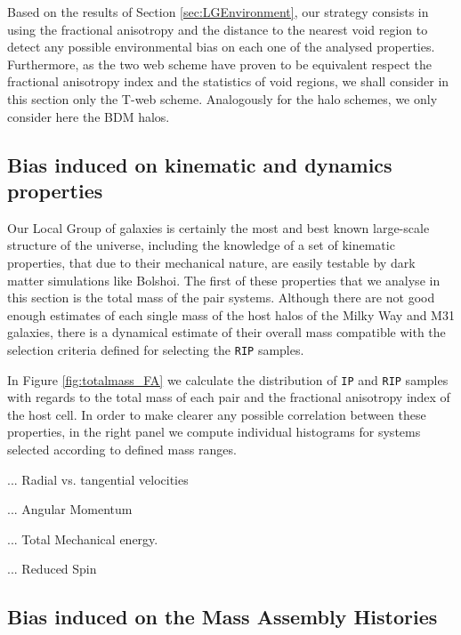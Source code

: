 \documentclass[usenatbib]{latex/mn2e}
\begin{document}
Based on the results of Section \ref{sec:LGEnvironment}, our strategy 
consists in using the fractional anisotropy and the distance to the 
nearest void region to detect any possible environmental bias on each
one of the analysed properties. Furthermore, as the two web scheme have
proven to be equivalent respect the fractional anisotropy index and the
statistics of void regions, we shall consider in this section only the 
T-web scheme. Analogously for the halo schemes, we only consider here the
BDM halos.




\subsection{Bias induced on kinematic and dynamics properties}
\label{subsec:bias_kinematic}



Our Local Group of galaxies is certainly the most and best known 
large-scale structure of the universe, including the knowledge of a set of
kinematic properties, that due to their mechanical nature, are easily 
testable by dark matter simulations like Bolshoi. The first of these 
properties that we analyse in this section is the total mass of the pair 
systems. Although there are not good enough estimates of each single mass 
of the host halos of the Milky Way and M31 galaxies, there is a dynamical 
estimate of their overall mass  compatible with the 
selection criteria defined for selecting the \texttt{RIP} samples.



In Figure \ref{fig:totalmass_FA} we calculate the distribution of 
\texttt{IP} and \texttt{RIP} samples with regards to the total mass of 
each pair and the fractional anisotropy index of the host cell. In order
to make clearer any possible correlation between these properties, in the
right panel we compute individual histograms for systems selected according 
to defined mass ranges.


... Radial vs. tangential velocities

... Angular Momentum

... Total Mechanical energy.

... Reduced Spin


\subsection{Bias induced on the Mass Assembly Histories}
\label{subsec:bias_MAH}
\end{document}
